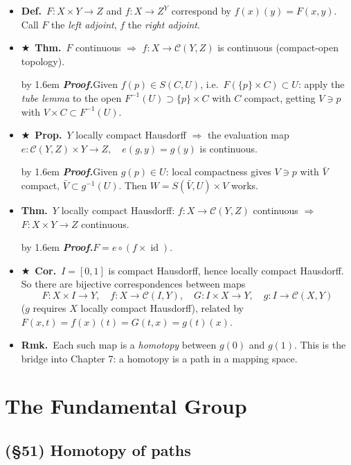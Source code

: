 \documentclass[12pt,a4paper]{article}
\newcommand{\Dfn}{\textbf{Def.}~}
\newcommand{\Thm}{\textbf{Thm.}~}
\newcommand{\Prp}{\textbf{Prop.}~}
\newcommand{\Cor}{\textbf{Cor.}~}
\newcommand{\Rmk}{\textbf{Rmk.}~}
\newcommand{\Key}{$\bigstar$~}                  %
\newcommand{\Pf}[1]{%
  \par\addvspace{7pt}\nopagebreak
  \begingroup
    \advance\leftskip by 1.6em
    \parindent=0pt \small\color{prf}%
    \textbf{\textit{Proof.}}\enspace #1\par
  \endgroup
  \addvspace{9pt}}
\newenvironment{BL}%
  {\begin{itemize}[leftmargin=1.4em,labelsep=0.55em,itemsep=11pt,topsep=11pt,parsep=0pt]}%
  {\end{itemize}}
\newcommand{\Map}{\mathscr{C}}
\DeclareMathOperator{\id}{id}
\newcommand{\imp}{\Rightarrow}
\begin{document}
\begin{BL}
\item \Dfn $F\colon X\times Y\to Z$ and $f\colon X\to Z^{Y}$ correspond by
      \(f(x)(y)=F(x,y).\)
      Call $F$ the \emph{left adjoint}, $f$ the \emph{right adjoint}.
\item \Key\Thm $F$ continuous $\imp$ $f\colon X\to\Map(Y,Z)$ is continuous
      (compact-open topology).
\Pf{Given $f(p)\in S(C,U)$, i.e.\ $F(\{p\}\times C)\subset U$: apply the \emph{tube lemma}
to the open $F^{-1}(U)\supset\{p\}\times C$ with $C$ compact, getting $V\ni p$ with
$V\times C\subset F^{-1}(U)$.}
\item \Key\Prp $Y$ locally compact Hausdorff $\imp$ the evaluation map
      \(e\colon\Map(Y,Z)\times Y\to Z,\quad e(g,y)=g(y)\) is continuous.
\Pf{Given $g(p)\in U$: local compactness gives $V\ni p$ with $\bar V$ compact,
$\bar V\subset g^{-1}(U)$. Then $W=S(\bar V,U)\times V$ works.}
\item \Thm $Y$ locally compact Hausdorff: $f\colon X\to\Map(Y,Z)$ continuous $\imp$
      $F\colon X\times Y\to Z$ continuous.
      \Pf{$F=e\circ(f\times\id)$.}
\item \Key\Cor $I=[0,1]$ is compact Hausdorff, hence locally compact Hausdorff. So there are
      bijective correspondences between maps
  \[
    F\colon X\times I\to Y,\quad f\colon X\to\Map(I,Y),\quad
    G\colon I\times X\to Y,\quad g\colon I\to\Map(X,Y)
  \]
  ($g$ requires $X$ locally compact Hausdorff), related by
  \(F(x,t)=f(x)(t)=G(t,x)=g(t)(x).\)
\item \Rmk Each such map is a \emph{homotopy} between $g(0)$ and $g(1)$. This is the bridge
      into Chapter 7: a homotopy is a path in a mapping space.
\end{BL}

\section{The Fundamental Group}

\subsection{(\S51) Homotopy of paths}
\end{document}
